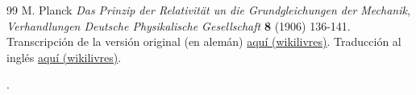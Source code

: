 \begin{thebibliography}{99}
 M. Planck {\it Das Prinzip der Relativität un die Grundgleichungen der Mechanik}, {\sl Verhandlungen Deutsche Physikalische Gesellschaft} {\bf 8} (1906) 136-141. Transcripción de la versión original (en alemán) \href{http://wikilivres.ca/wiki/Das_Prinzip_der_Relativit\%C3\%A4t_und_die_Grundgleichungen_der_Mechanik}{aquí (wikilivres)}. Traducción al inglés  \href{http://en.wikisource.org/wiki/Translation:The_Principle_of_Relativity_and_the_Fundamental_Equations_of_Mechanics}{aquí (wikilivres)}.

\end{thebibliography}.
